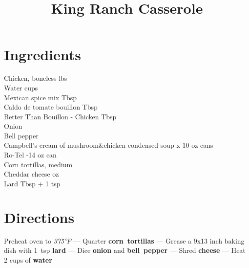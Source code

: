 \documentclass[11pt,letterpaper]{article}
\title{King Ranch Casserole}
\author{}
\date{}
\begin{document}
\maketitle
\thispagestyle{empty}

\section*{Ingredients}
\setlength{\columnsep}{20pt}
\begin{multicols}{2}
\noindent
    Chicken, boneless  lbs \\
    Water  cups \\
    Mexican spice mix  Tbsp \\
    Caldo de tomate bouillon  Tbsp \\
    Better Than Bouillon - Chicken  Tbsp \\
    Onion  \\
    \columnbreak
    Bell pepper  \\
    Campbell's cream of mushroom\&chicken condensed soup  x 10 oz cans \\
    Ro-Tel -14 oz can \\
    Corn tortillas, medium  \\
    Cheddar cheese  oz \\
    Lard  Tbsp + 1 tsp
\end{multicols}

\section*{Directions}

\noindent
Preheat oven to \textit{375°F} ---
Quarter \textbf{corn~tortillas} ---
Grease a 9x13 inch baking dish with 1~tsp \textbf{lard} ---
Dice \textbf{onion} and \textbf{bell~pepper} ---
Shred \textbf{cheese} ---
Heat 2 cups of \textbf{water}
\end{document}
